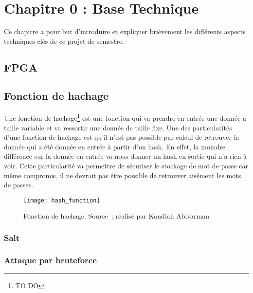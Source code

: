 \chapter{Chapitre 0 : Base Technique}

Ce chapitre a pour but d'introduire et expliquer brièvement les différents aspects techniques clés de ce projet de semestre.

\section{FPGA}


\section{Fonction de hachage}

Une fonction de hachage\footnote{TO DO} est une fonction qui va prendre en entrée une donnée a taille variable et va ressortir une donnée de taille fixe. Une des particularités d'une fonction de hachage est qu'il n'est pas possible par calcul de retrouver la donnée qui a été donnée en entrée à partir d'un hash. En effet, la moindre différence sur la donnée en entrée va nous donner un hash en sortie qui n'a rien à voir. Cette particularité va permettre de sécuriser le stockage de mot de passe car même compromis, il ne devrait pas être possible de retrouver aisément les mots de passes.

\begin{figure}[tbph!]
	\centering
	\texttt{[image: hash\_function]}
	\caption[Fonction de hachage]{Fonction de hachage. Source : réalisé par Kandiah Abivarman}
	\label{fig:fonction_hachage}
\end{figure}


\subsection{Salt}



\subsection{Attaque par bruteforce}

